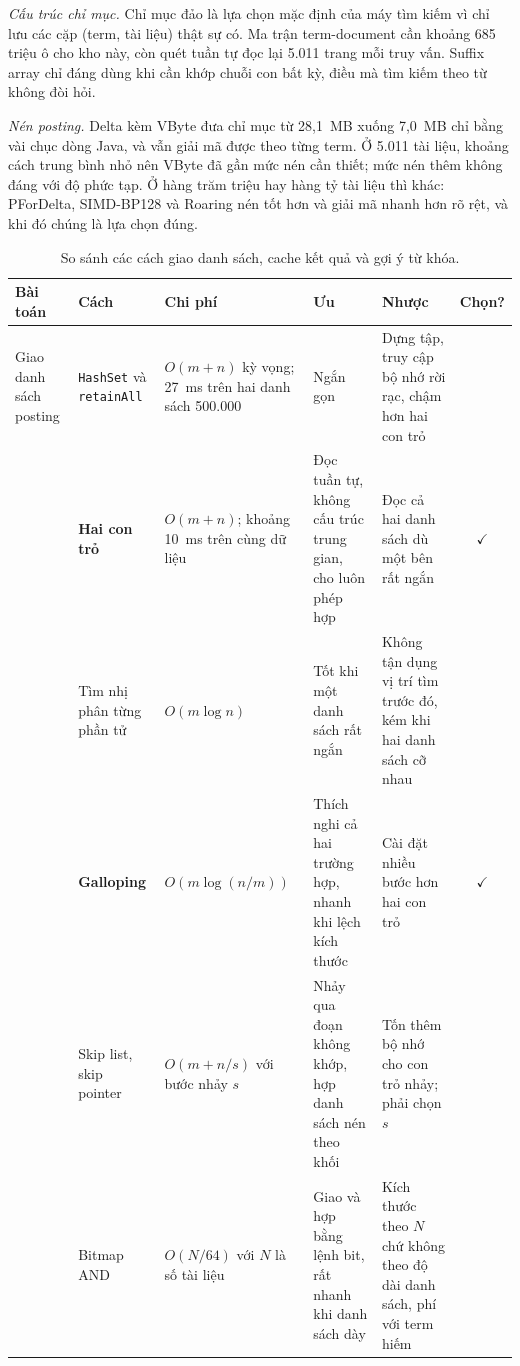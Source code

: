 \documentclass[9pt,twocolumn,a4paper]{extarticle}
\newcommand{\code}[1]{\texttt{#1}}
\begin{document}
\emph{Cấu trúc chỉ mục.} Chỉ mục đảo là lựa chọn mặc định của máy tìm kiếm vì chỉ lưu các cặp (term, tài liệu) thật sự có. Ma trận term-document cần khoảng 685 triệu ô cho kho này, còn quét tuần tự đọc lại 5.011 trang mỗi truy vấn. Suffix array chỉ đáng dùng khi cần khớp chuỗi con bất kỳ, điều mà tìm kiếm theo từ không đòi hỏi.

\emph{Nén posting.} Delta kèm VByte đưa chỉ mục từ 28,1~MB xuống 7,0~MB chỉ bằng vài chục dòng Java, và vẫn giải mã được theo từng term. Ở 5.011 tài liệu, khoảng cách trung bình nhỏ nên VByte đã gần mức nén cần thiết; mức nén thêm không đáng với độ phức tạp. Ở hàng trăm triệu hay hàng tỷ tài liệu thì khác: PForDelta, SIMD-BP128 và Roaring nén tốt hơn và giải mã nhanh hơn rõ rệt, và khi đó chúng là lựa chọn đúng.

\begin{table}[!t]
\centering
\caption{So sánh các cách giao danh sách, cache kết quả và gợi ý từ khóa.}
\label{tab:cmp2c}
\footnotesize
\setlength{\tabcolsep}{3pt}
\begin{tabular}{@{}>{\raggedright\arraybackslash}p{1.9cm}>{\raggedright\arraybackslash}p{3.1cm}>{\raggedright\arraybackslash}p{2.6cm}>{\raggedright\arraybackslash}p{3.9cm}>{\raggedright\arraybackslash}p{4.1cm}c@{}}
\toprule
Bài toán & Cách & Chi phí & Ưu & Nhược & Chọn? \\
\midrule
Giao danh sách posting
& \code{HashSet} và \code{retainAll} & $O(m+n)$ kỳ vọng; 27~ms trên hai danh sách 500.000 & Ngắn gọn & Dựng tập, truy cập bộ nhớ rời rạc, chậm hơn hai con trỏ & \\
& \textbf{Hai con trỏ} & $O(m+n)$; khoảng 10~ms trên cùng dữ liệu & Đọc tuần tự, không cấu trúc trung gian, cho luôn phép hợp & Đọc cả hai danh sách dù một bên rất ngắn & $\checkmark$ \\
& Tìm nhị phân từng phần tử & $O(m\log n)$ & Tốt khi một danh sách rất ngắn & Không tận dụng vị trí tìm trước đó, kém khi hai danh sách cỡ nhau & \\
& \textbf{Galloping} & $O(m\log(n/m))$ & Thích nghi cả hai trường hợp, nhanh khi lệch kích thước & Cài đặt nhiều bước hơn hai con trỏ & $\checkmark$ \\
& Skip list, skip pointer & $O(m+n/s)$ với bước nhảy $s$ & Nhảy qua đoạn không khớp, hợp danh sách nén theo khối & Tốn thêm bộ nhớ cho con trỏ nhảy; phải chọn $s$ & \\
& Bitmap AND & $O(N/64)$ với $N$ là số tài liệu & Giao và hợp bằng lệnh bit, rất nhanh khi danh sách dày & Kích thước theo $N$ chứ không theo độ dài danh sách, phí với term hiếm & \\

\end{tabular}
\end{table}
\end{document}
